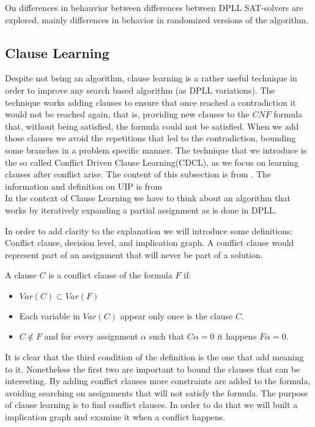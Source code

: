 On \cite{gomes2009exploiting} differences in behauvior between differences between DPLL SAT-solvers are explored, mainly differences in behavior in randomized versions of the algorithm.


\subsection{Clause Learning}
\label{sub:clauselearning}
Despite not being an algorithm, clause learning is a rather useful technique in order to improve any search based algorithm (as DPLL variations).  The technique works adding clauses to ensure that once reached a contradiction it would not be reached again, that is, providing new clauses to the $CNF$ formula that, without being satisfied, the formula could not be satisfied. When we add those clauses we avoid the repetitions that led to the contradiction, bounding some branches in a problem specific manner. The technique that we introduce is the so called Conflict Driven Clause Learning(CDCL), as we focus on learning clauses after conflict arise. The content of this subsection is from \cite{tichy2006clause}. The information and definition on UIP is from \cite{zhang2001efficient} \\

In the context of Clause Learning we have to think about an algorithm that works by iteratively expanding a partial assignment as is done in DPLL.


In order to add clarity to the explanation we will introduce some definitions: Conflict clause, decision level, and implication graph. A conflict clause would represent part of an assignment that will never be part of a solution.  

\begin{definition}
  A clause $C$ is a conflict clause of the formula $F$ if:
  \begin{itemize}
  \item $Var(C) \subset Var(F)$
  \item Each variable in $Var(C)$ appear only once is the clause $C$.  
  \item $C \not\in F$ and for every assignment $\alpha$ such that $C\alpha = 0$ it happens $F\alpha = 0$.
  \end{itemize}
\end{definition}

It is clear that the third condition of the definition is the one that add meaning to it. Nonetheless the first two are important to bound the clauses that can be interesting. By adding conflict clauses more constraints are added to the formula, avoiding searching on assignments that will not satisfy the formula. The purpose of clause learning is to find conflict clauses. In order to do that we will built a implication graph and examine it when a conflict happens.\\

